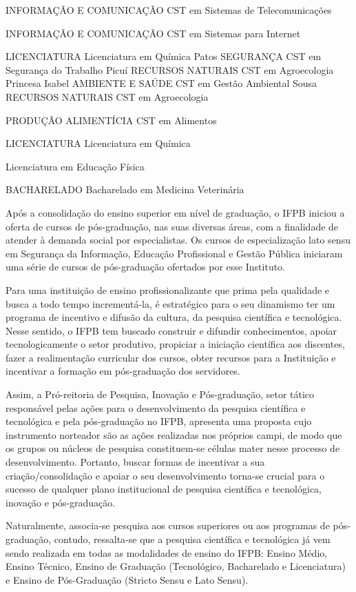 INFORMAÇÃO E COMUNICAÇÃO
CST em Sistemas de Telecomunicações

INFORMAÇÃO E COMUNICAÇÃO
CST em Sistemas para Internet

LICENCIATURA
Licenciatura em Química
Patos
SEGURANÇA
CST em Segurança do Trabalho
Picuí
RECURSOS NATURAIS
CST em Agroecologia
Princesa Isabel
AMBIENTE E SAÚDE
CST em Gestão Ambiental
Sousa
RECURSOS NATURAIS
CST em Agroecologia

PRODUÇÃO ALIMENTÍCIA
CST em Alimentos

LICENCIATURA
Licenciatura em Química



Licenciatura em Educação Física

BACHARELADO
Bacharelado em Medicina Veterinária

	Após a consolidação do ensino superior em nível de graduação, o IFPB iniciou a oferta de cursos de pós-graduação, nas suas diversas áreas, com a finalidade de atender à demanda social por especialistas. Os cursos de especialização lato sensu em Segurança da Informação, Educação Profissional e Gestão Pública iniciaram uma série de cursos de pós-graduação ofertados por esse Instituto.
	
	Para uma instituição de ensino profissionalizante que prima pela qualidade e busca a todo tempo incrementá-la, é estratégico para o seu dinamismo ter um programa de incentivo e difusão da cultura, da pesquisa científica e tecnológica. Nesse sentido, o IFPB tem buscado construir e difundir conhecimentos, apoiar tecnologicamente o setor produtivo, propiciar a iniciação científica aos discentes, fazer a realimentação curricular dos cursos, obter recursos para a Instituição e incentivar a formação em pós-graduação dos servidores.
	
	Assim, a Pró-reitoria de Pesquisa, Inovação e Pós-graduação, setor tático responsável pelas ações para o desenvolvimento da pesquisa científica e tecnológica e pela pós-graduação no IFPB, apresenta uma proposta cujo instrumento norteador são as ações realizadas nos próprios campi, de modo que os grupos ou núcleos de pesquisa constituem-se células mater nesse processo de desenvolvimento. Portanto, buscar formas de incentivar a sua criação/consolidação e apoiar o seu desenvolvimento torna-se crucial para o sucesso de qualquer plano institucional de pesquisa científica e tecnológica, inovação e pós-graduação.
	
	Naturalmente, associa-se pesquisa aos cursos superiores ou aos programas de pós-graduação, contudo, ressalta-se que a pesquisa científica e tecnológica já vem sendo realizada em todas as modalidades de ensino do IFPB: Ensino Médio, Ensino Técnico, Ensino de Graduação (Tecnológico, Bacharelado e Licenciatura) e Ensino de Pós-Graduação (Stricto Sensu e Lato Sensu).
	
